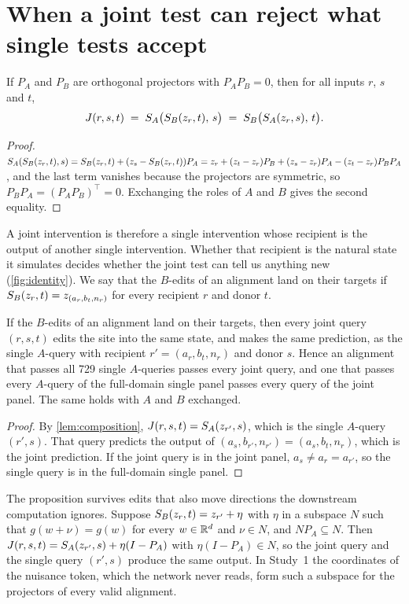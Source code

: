 \section{When a joint test can reject what single tests accept}\label{sec:theory}

\begin{lemma}[Composition]\label{lem:composition}
If $P_A$ and $P_B$ are orthogonal projectors with $P_AP_B=0$, then for all inputs $r$, $s$ and $t$,
\[
  J(r,s,t) \;=\; S_A\bigl(S_B(z_r,t),\,s\bigr) \;=\; S_B\bigl(S_A(z_r,s),\,t\bigr).
\]
\end{lemma}

\begin{proof}
$S_A(S_B(z_r,t),s)=S_B(z_r,t)+(z_s-S_B(z_r,t))P_A=z_r+(z_t-z_r)P_B+(z_s-z_r)P_A-(z_t-z_r)P_BP_A$, and the last
term vanishes because the projectors are symmetric, so $P_BP_A=(P_AP_B)^{\top}=0$. Exchanging the roles of $A$ and
$B$ gives the second equality.
\end{proof}

A joint intervention is therefore a single intervention whose recipient is the output of another single
intervention. Whether that recipient is the natural state it simulates decides whether the joint test can tell us
anything new (\cref{fig:identity}). We say that the $B$-edits of an alignment land on their targets if
$S_B(z_r,t)=z_{(a_r,b_t,n_r)}$ for every recipient $r$ and donor $t$.

\begin{proposition}\label{prop:redundant}
If the $B$-edits of an alignment land on their targets, then every joint query $(r,s,t)$ edits the site into the
same state, and makes the same prediction, as the single $A$-query with recipient $r'=(a_r,b_t,n_r)$ and donor
$s$. Hence an alignment that passes all 729 single $A$-queries passes every joint query, and one that passes every
$A$-query of the full-domain single panel passes every query of the joint panel. The same holds with $A$ and $B$
exchanged.
\end{proposition}

\begin{proof}
By \cref{lem:composition}, $J(r,s,t)=S_A(z_{r'},s)$, which is the single $A$-query $(r',s)$. That query predicts
the output of $(a_s,b_{r'},n_{r'})=(a_s,b_t,n_r)$, which is the joint prediction. If the joint query is in the joint
panel, $a_s\ne a_r=a_{r'}$, so the single query is in the full-domain single panel.
\end{proof}

\begin{remark}\label{rem:null}
The proposition survives edits that also move directions the downstream computation ignores. Suppose
$S_B(z_r,t)=z_{r'}+\eta$ with $\eta$ in a subspace $N$ such that $g(w+\nu)=g(w)$ for every $w\in\mathbb{R}^d$ and
$\nu\in N$, and $NP_A\subseteq N$. Then $J(r,s,t)=S_A(z_{r'},s)+\eta(I-P_A)$ with $\eta(I-P_A)\in N$, so the joint
query and the single query $(r',s)$ produce the same output. In Study~1 the coordinates of the nuisance token, which
the network never reads, form such a subspace for the projectors of every valid alignment.
\end{remark}

